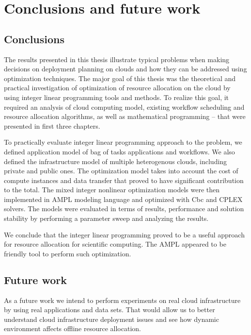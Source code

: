 \chapter{Conclusions and future work}
\label{chap:conclusions} 

\section{Conclusions}

The results presented in this thesis illustrate typical problems when making decisions on deployment planning on clouds and how they can be addressed using optimization techniques. The major goal of this thesis was the theoretical and practical investigation of optimization of resource allocation on the cloud by using integer linear programming tools and methods. To realize this goal, it required an analysis of cloud computing model, existing workflow scheduling and resource allocation algorithms, as well as mathematical programming -- that were presented in first three chapters. 

To practically evaluate integer linear programming approach to the problem, we defined application model of bag of tasks applications and workflows. We also defined the infrastructure model of multiple heterogenous clouds, including private and public ones. The optimization model takes into account the cost of compute instances and data transfer that proved to have significant contribution to the total. The mixed integer nonlinear optimization models were then implemented in AMPL modeling language and optimized with Cbc and CPLEX solvers. The models were evaluated in terms of results, performance and solution stability by performing a parameter sweep and analyzing the results. 

We conclude that the integer linear programming proved to be a useful approach for resource allocation for scientific computing. The AMPL appeared to be friendly tool to perform such optimization.

\section{Future work}

As a future work we intend to perform experiments on real cloud infrastructure by using real applications and data sets. That would allow us to better understand cloud infrastructure deployment issues and see how dynamic environment affects offline resource allocation.

